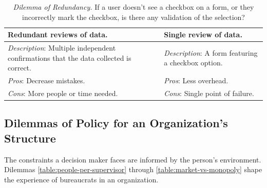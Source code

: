 

\begin{center}
\begin{table}[H] %
\begin{tabular}{ | m{\dilemmatablewidth}| m{\dilemmatablewidth} | } 
  \hline
  \textbf{Redundant reviews of data.} &
  \textbf{Single review of data.} \\
  \hline
  \textit{Description}: Multiple independent confirmations that the data collected is correct. & 
  \textit{Description}: A form featuring a checkbox option.  \\
  \hline
  \textit{Pros}: Decrease mistakes. & 
  \textit{Pros}: Less overhead. \\
  \hline
  \textit{Cons}: More people or time needed. & 
  \textit{Cons}: Single point of failure. \\
  \hline
\end{tabular}
\caption{
\textit{Dilemma of Redundancy.}
If a user doesn't see a checkbox on a form, or they incorrectly mark the checkbox, is there any validation of the selection?
}
\label{table:dilemma-of-redundancy}
\end{table}
\end{center}



\subsection*{Dilemmas of Policy for an Organization's Structure\label{sec:org-dilemma}}

The constraints a decision maker faces are informed by the person's environment. Dilemmas \ref{table:people-per-supervisor} through \ref{table:market-vs-monopoly} shape the experience of bureaucrats in an organization.

